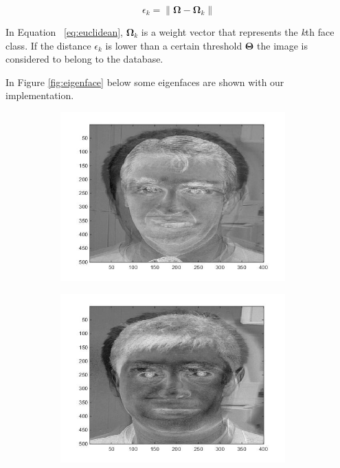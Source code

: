 \begin{equation}
\epsilon_k = \left \| \mathbf{\Omega} - \mathbf{\Omega}_k  \right \| 	
\label{eq:euclidean}
\end{equation}

	In Equation ~\ref{eq:euclidean}, $\mathbf{\Omega}_k$ is a weight vector that represents the \emph{k}th face class. If the distance $\epsilon_k$ is lower than a certain threshold $\mathbf{\Theta} $ the image is considered to belong to the database.

In Figure \ref{fig:eigenface} below some eigenfaces are shown with our implementation.

\begin{figure}[H]
\centering

\begin{subfigure}{.24\textwidth}
  \centering
  \includegraphics[width=0.95\textwidth]{img/fr/eigenface1.jpg}
  \caption{}
\end{subfigure}%
\begin{subfigure}{.24\textwidth}
  \centering
  \includegraphics[width=0.95\textwidth]{img/fr/eigenface2.jpg}

\end{subfigure}
\end{figure}
